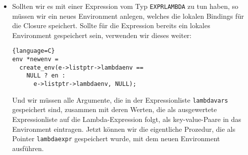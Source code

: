 \begin{itemize}
\begin{itemize}
\begin{lstlisting}[language=Scheme]
(if (cond) (true_expr) (false_expr))
\end{lstlisting}
          Die \emph{Condition} muss ausgewertet werden und, je nachdem ob als
          Ergebnis die vordefinierte Symbolic Expression \texttt{\#t} oder
          \texttt{\#f} zurückgegeben wird, werten wir entweder die dritte
          oder die vierte Expression aus.
        \item \texttt{begin}: Dieser Operator wertet eine nachfolgende
          Liste von Expressions aus und gibt den Wert der letzten ausgewerteten
          Expression zurück. In diesem Fall setzen wir einfach der auf die
        Symbolic Expression mit dem Namen \texttt{begin} zeigt, eine Expression
        weiter nach vorne in der Liste und werten die so neu entstandene Liste
        mit \texttt{evalList} rekursiv aus.
        \item \texttt{lambda}: Falls wir eine Expression der folgenden Form
          vorliegen haben, müssen wir daraus eine neue Lambda-Expression
          konstruieren:
\begin{lstlisting}{language=Scheme}
(lambda (arguments) (body))
\end{lstlisting}
        In diesem Fall legen wir mit \texttt{create\_expr} eine neue
        \texttt{EXPRLAMBDA} an und lassen deren \texttt{lambdavars}-Feld auf
        die \texttt{arguments} zeigen und das \texttt{lambdaexpr}-Feld auf den 
        \texttt{body}. Diese neue Lambda-Expression geben wir anschließend
        zurück.
    \end{itemize}
  \item Sollten wir es mit einer Expression vom Typ \texttt{EXPRLAMBDA} zu tun 
    haben, so müssen wir ein neues Environment anlegen, welches die lokalen
    Bindings für die Closure speichert. Sollte für die Expression bereits ein
    lokales Environment gespeichert sein, verwenden wir dieses weiter:
\begin{lstlisting}{language=C}
env *newenv =
  create_env(e->listptr->lambdaenv ==
    NULL ? en : 
      e->listptr->lambdaenv, NULL);
\end{lstlisting}
    Und wir müssen alle Argumente, die in
    der Expressionliste \texttt{lambdavars} gespeichert sind, zusammen mit
    deren Werten, die als ausgewertete Expressionliste auf die 
    Lambda-Expression folgt, als key-value-Paare in das Environment eintragen.
    Jetzt können wir die eigentliche Prozedur, die als Pointer
    \texttt{lambdaexpr} gespeichert wurde, mit dem neuen Environment ausführen.

\end{itemize}
